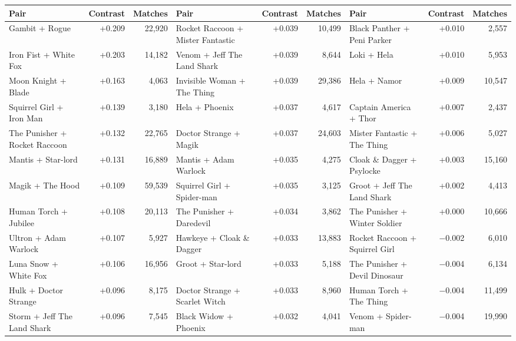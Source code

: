 \documentclass[11pt]{article}
\renewcommand{\arraystretch}{1.06}
\begin{document}
\begin{landscape}
\begin{center}
{\scriptsize\setlength{\tabcolsep}{2.8pt}\renewcommand{\arraystretch}{1.0}
\label{tab:tu}
\begin{tabular}{l r r @{\hspace{1em}} l r r @{\hspace{1em}} l r r}
\toprule
Pair & Contrast & Matches & Pair & Contrast & Matches & Pair & Contrast & Matches \\
\midrule
Gambit + Rogue & +0.209 & 22,920 & Rocket Raccoon + Mister Fantastic & +0.039 & 10,499 & Black Panther + Peni Parker & +0.010 & 2,557 \\
Iron Fist + White Fox & +0.203 & 14,182 & Venom + Jeff The Land Shark & +0.039 & 8,644 & Loki + Hela & +0.010 & 5,953 \\
Moon Knight + Blade & +0.163 & 4,063 & Invisible Woman + The Thing & +0.039 & 29,386 & Hela + Namor & +0.009 & 10,547 \\
Squirrel Girl + Iron Man & +0.139 & 3,180 & Hela + Phoenix & +0.037 & 4,617 & Captain America + Thor & +0.007 & 2,437 \\
The Punisher + Rocket Raccoon & +0.132 & 22,765 & Doctor Strange + Magik & +0.037 & 24,603 & Mister Fantastic + The Thing & +0.006 & 5,027 \\
Mantis + Star-lord & +0.131 & 16,889 & Mantis + Adam Warlock & +0.035 & 4,275 & Cloak \& Dagger + Psylocke & +0.003 & 15,160 \\
Magik + The Hood & +0.109 & 59,539 & Squirrel Girl + Spider-man & +0.035 & 3,125 & Groot + Jeff The Land Shark & +0.002 & 4,413 \\
Human Torch + Jubilee & +0.108 & 20,113 & The Punisher + Daredevil & +0.034 & 3,862 & The Punisher + Winter Soldier & +0.000 & 10,666 \\
Ultron + Adam Warlock & +0.107 & 5,927 & Hawkeye + Cloak \& Dagger & +0.033 & 13,883 & Rocket Raccoon + Squirrel Girl & $-$0.002 & 6,010 \\
Luna Snow + White Fox & +0.106 & 16,956 & Groot + Star-lord & +0.033 & 5,188 & The Punisher + Devil Dinosaur & $-$0.004 & 6,134 \\
Hulk + Doctor Strange & +0.096 & 8,175 & Doctor Strange + Scarlet Witch & +0.033 & 8,960 & Human Torch + The Thing & $-$0.004 & 11,499 \\
Storm + Jeff The Land Shark & +0.096 & 7,545 & Black Widow + Phoenix & +0.032 & 4,041 & Venom + Spider-man & $-$0.004 & 19,990 \\

\end{tabular}}
\end{center}
\end{landscape}
\end{document}
